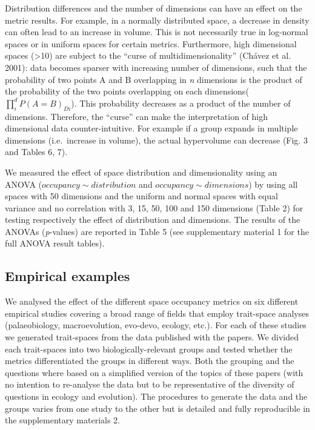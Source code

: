 \documentclass[]{article}
\begin{document}
Distribution differences and the number of dimensions can have an effect
on the metric results. For example, in a normally distributed space, a
decrease in density can often lead to an increase in volume. This is not
necessarily true in log-normal spaces or in uniform spaces for certain
metrics. Furthermore, high dimensional spaces (\textgreater{}10) are
subject to the ``curse of multidimensionality'' (Chávez et al. 2001):
data becomes sparser with increasing number of dimensions, such that the
probability of two points A and B overlapping in \emph{n} dimensions is
the product of the probability of the two points overlapping on each
dimensions(\(\prod_{i}^{d} P(A = B)_{Di}\)). This probability decreases
as a product of the number of dimensions. Therefore, the ``curse'' can
make the interpretation of high dimensional data counter-intuitive. For
example if a group expands in multiple dimensions (i.e.~increase in
volume), the actual hypervolume can decrease (Fig. 3 and Tables 6, 7).

We measured the effect of space distribution and dimensionality using an
ANOVA (\(occupancy \sim distribution\) and
\(occupancy \sim dimensions\)) by using all spaces with 50 dimensions
and the uniform and normal spaces with equal variance and no correlation
with 3, 15, 50, 100 and 150 dimensions (Table 2) for testing
respectively the effect of distribution and dimensions. The results of
the ANOVAs (\emph{p}-values) are reported in Table 5 (see supplementary
material 1 for the full ANOVA result tables).

\subsection{Empirical examples}\label{empirical-examples}

We analysed the effect of the different space occupancy metrics on six
different empirical studies covering a broad range of fields that employ
trait-space analyses (palaeobiology, macroevolution, evo-devo, ecology,
etc.). For each of these studies we generated trait-spaces from the data
published with the papers. We divided each trait-spaces into two
biologically-relevant groups and tested whether the metrics
differentiated the groups in different ways. Both the grouping and the
questions where based on a simplified version of the topics of these
papers (with no intention to re-analyse the data but to be
representative of the diversity of questions in ecology and evolution).
The procedures to generate the data and the groups varies from one study
to the other but is detailed and fully reproducible in the supplementary
materials 2.
\end{document}
